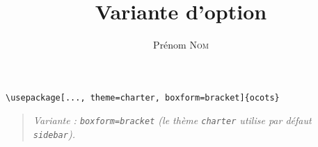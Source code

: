 \documentclass[11pt]{ocots-book}
\title{Variante d'option}
\author{Prénom \textsc{Nom}}
\newcommand{\ocotsvariantnote}[1]{\begin{quote}\itshape Variante : #1\end{quote}}
\begin{document}
\maketitle

\begin{lstlisting}
\usepackage[..., theme=charter, boxform=bracket]{ocots}
\end{lstlisting}
\ocotsvariantnote{\texttt{boxform=bracket} (le th\`eme \texttt{charter} utilise par d\'efaut \texttt{sidebar}).}

\end{document}
